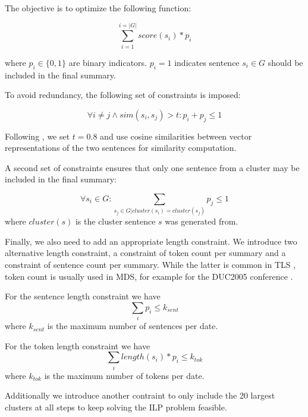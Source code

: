 \documentclass[a4paper,BCOR=10mm]{report}
\numberwithin{lemma}{chapter}
\numberwithin{definition}{chapter}
\begin{document}
The objective is to optimize the following function:

\begin{equation}
\sum_{i = 1}^{i = |G|} \mathit{score}(s_i) * p_i
\end{equation}

where $p_i \in \{0, 1\}$ are binary indicators. $p_i = 1$ indicates sentence $s_i \in G$ should be included in the final summary.

To avoid redundancy, the following set of constraints is imposed:

\begin{equation}
\forall i \neq j \land \mathit{sim}(s_i, s_j) > t : p_i + p_{j} \leq 1
\end{equation}

Following \citet{banerjee}, we set $t = 0.8$ and use cosine similarities between vector representations of the two sentences for similarity computation.

A second set of constraints ensures that only one sentence from a cluster may be included in the final summary:

\begin{equation}
\forall s_i \in G: \sum_{s_j \in G | \mathit{cluster}(s_i) = \mathit{cluster}(s_j)} p_j \leq 1
\end{equation}
where $\mathit{cluster}(s)$ is the cluster sentence $s$ was generated from.

Finally, we also need to add an appropriate length constraint.
We introduce two alternative length constraint, a constraint of token count per summary and a constraint of sentence count per summary.
While the latter is common in TLS \citep{markert, yan-trans}, token count is usually used in MDS, for example for the DUC2005 conference \citep{duc2005}.

For the sentence length constraint we have
\begin{equation}
\sum_{i} p_i \leq k_{sent}
\end{equation}
where $k_{sent}$ is the maximum number of sentences per date.

For the token length constraint we have
\begin{equation}
\sum_{i} \mathit{length}(s_i) * p_i \leq k_{tok}
\end{equation}
where $k_{tok}$ is the maximum number of tokens per date.


Additionally we introduce another contraint to only include the 20 largest clusters at all steps to keep solving the ILP problem feasible.
\end{document}
